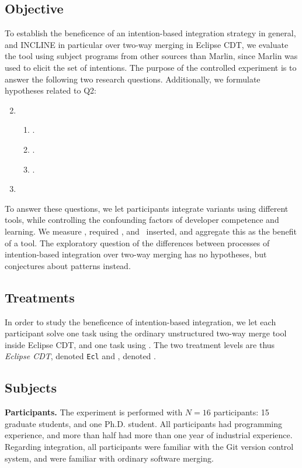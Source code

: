 \subsection{Objective}
To establish the beneficence of an intention-based integration strategy in general, and INCLINE in particular over two-way merging in Eclipse CDT, we evaluate the tool using subject programs from other sources than Marlin, since Marlin was used to elicit the set of intentions. The purpose of the controlled experiment is to answer the following two research questions. Additionally, we formulate hypotheses related to Q2:

\begin{enumerate}[label={Q\arabic*}]
    \setcounter{enumi}{1}
    \item \RQB
    \begin{enumerate}[label={H\arabic*}]
        \item \HA.
        \item \HB.
        \item \HC.
    \end{enumerate}
    \item \RQC
\end{enumerate}

To answer these questions, we let participants integrate variants using different tools, while controlling the confounding factors of developer competence and learning. We measure \ctime, required \eops, and ~inserted, and aggregate this as the benefit of a tool. The exploratory question of the differences between processes of intention-based integration over two-way merging has no hypotheses, but conjectures about patterns instead.

\subsection{Treatments}
In order to study the beneficence of intention-based integration, we let each participant solve one task using the ordinary unstructured two-way merge tool inside Eclipse CDT, and one task using \tooln. The two treatment levels are thus \textit{Eclipse CDT}, denoted \texttt{Ecl} and \textit{\tooln}, denoted \inc.

\subsection{Subjects}
\textbf{Participants.}
The experiment is performed with $N=16$ participants: 15 graduate students, and one Ph.D. student. All participants had programming experience, and more than half had more than one year of industrial experience. Regarding integration, all participants were familiar with the Git version control system, and were familiar with ordinary software merging.

